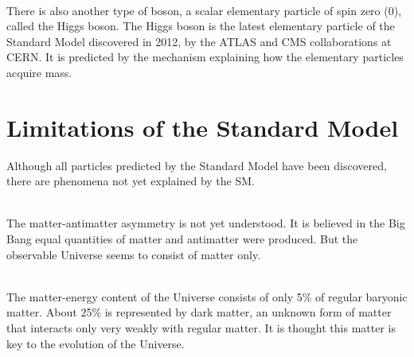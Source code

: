 \ \\There is also another type of boson, a scalar elementary particle of spin zero (0), called the Higgs boson. The Higgs boson is the latest elementary particle of the Standard Model discovered in 2012, by the ATLAS and CMS collaborations at CERN. It is predicted by the mechanism explaining how the elementary particles acquire mass.

\section{Limitations of the Standard Model}
\label{sec:SMLimitations}

Although all particles predicted by the Standard Model have been discovered, there are phenomena not yet explained by the SM. 

\ \\The matter-antimatter asymmetry is not yet understood. It is believed in the Big Bang equal quantities of matter and antimatter were produced. But the observable Universe seems to consist of matter only.

\ \\The matter-energy content of the Universe consists of only 5\% of regular baryonic matter. About 25\% is represented by dark matter, an unknown form of matter that interacts only very weakly with regular matter. It is thought this matter is key to the evolution of the Universe.



